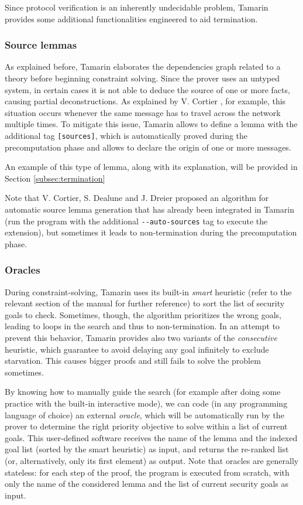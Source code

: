 \documentclass[fleqn,10pt]{SelfArx} %
\begin{document}
Since protocol verification is an inherently undecidable problem, Tamarin provides some additional functionalities engineered to aid termination.

\subsubsection{Source lemmas}

As explained before, Tamarin elaborates the dependencies graph related to a theory before beginning constraint solving. Since the prover uses an untyped system, in certain cases it is not able to deduce the source of one or more facts, causing partial deconstructions. As explained by V. Cortier \cite{autosources}, for example, this situation occurs whenever the same message has to travel across the network multiple times. To mitigate this issue, Tamarin allows to define a lemma with the additional tag \lstinline|[sources]|, which is automatically proved during the precomputation phase and allows to declare the origin of one or more messages.

An example of this type of lemma, along with its explanation, will be provided in Section \ref{subsec:termination}

Note that V. Cortier, S. Dealune and J. Dreier proposed an algorithm for automatic source lemma generation \cite{autosources} that has already been integrated in Tamarin (run the program with the additional \lstinline|--auto-sources| tag to execute the extension), but sometimes it leads to non-termination during the precomputation phase.

\subsubsection{Oracles}

During constraint-solving, Tamarin uses its built-in \textit{smart} heuristic (refer to the relevant section of the manual \cite{tamarinManual} for further reference) to sort the list of security goals to check. Sometimes, though, the algorithm prioritizes the wrong goals, leading to loops in the search and thus to non-termination. In an attempt to prevent this behavior, Tamarin provides also two variants of the \textit{consecutive} heuristic, which guarantee to avoid delaying any goal infinitely to exclude starvation. This causes bigger proofs and still fails to solve the problem sometimes.

By knowing how to manually guide the search (for example after doing some practice with the built-in interactive mode), we can code (in any programming language of choice) an external \textit{oracle}, which will be automatically run by the prover to determine the right priority objective to solve within a list of current goals. This user-defined software receives the name of the lemma and the indexed goal list (sorted by the smart heuristic) as input, and returns the re-ranked list (or, alternatively, only its first element) as output. Note that oracles are generally stateless: for each step of the proof, the program is executed from scratch, with only the name of the considered lemma and the list of current security goals as input.
\end{document}

